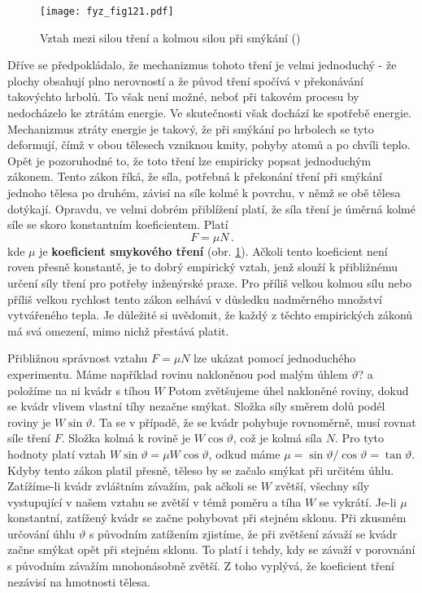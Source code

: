{    \begin{figure}[ht!]  %
      \centering
      \texttt{[image: fyz\_fig121.pdf]}
      \caption{Vztah mezi silou tření a kolmou silou při smýkání
              (\cite[s.~173]{Feynman01})}
      \label{fyz:fig121}
    \end{figure}
    Dříve se předpokládalo, že mechanizmus tohoto tření je velmi jednoduchý - že plochy obsahují 
    plno nerovností a že původ tření spočívá v překonávání takovýchto hrbolů. To však není možné, 
    neboť při takovém procesu by nedocházelo ke ztrátám energie. Ve skutečnosti však dochází ke 
    spotřebě energie. Mechanizmus ztráty energie je takový, že při smýkání po hrbolech se tyto 
    deformují, čímž v obou tělesech vzniknou kmity, pohyby atomů a po chvíli teplo. Opět je 
    pozoruhodné to, že toto tření lze empiricky popsat jednoduchým zákonem. Tento zákon říká, že 
    síla, potřebná k překonání tření při smýkání jednoho tělesa po druhém, závisí na síle kolmé k 
    povrchu, v němž se obě tělesa dotýkají. Opravdu, ve velmi dobrém přiblížení platí, že síla 
    tření je úměrná kolmé síle se skoro konstantním koeficientem. Platí
    \begin{equation}\label{FYZ:eq169}
      \boxed{F = \mu N}\,.
    \end{equation}
    kde \(\mu\) je \textbf{koeficient smykového tření} (obr. \ref{fyz:fig121}). Ačkoli tento 
    koeficient není roven přesně konstantě, je to dobrý empirický vztah, jenž slouží k přibližnému 
    určení síly tření pro potřeby inženýrské praxe. Pro příliš velkou kolmou sílu nebo příliš 
    velkou rychlost tento zákon selhává v důsledku nadměrného množství vytvářeného tepla. Je 
    důležité si uvědomit, že každý z těchto empirických zákonů má svá omezení, mimo nichž přestává 
    platit.
    
    Přibližnou správnost vztahu \(F = \mu N\) lze ukázat pomocí jednoduchého experimentu. Máme 
    například rovinu nakloněnou pod malým úhlem \(\vartheta\)? a položíme na ni kvádr s tíhou \(W\) 
    Potom zvětšujeme úhel nakloněné roviny, dokud se kvádr vlivem vlastní tíhy nezačne smýkat. 
    Složka síly směrem dolů podél roviny je \(W\sin\vartheta\). Ta se v případě, že se kvádr 
    pohybuje rovnoměrně, musí rovnat síle tření \(F\). Složka kolmá k rovině je \(W\cos\vartheta\), 
    což je kolmá síla \(N\). Pro tyto hodnoty platí vztah \(W\sin\vartheta = \mu W\cos\vartheta\), 
    odkud máme \(\mu = \sin\vartheta/\cos\vartheta = \tan\vartheta\). Kdyby tento zákon platil 
    přesně, těleso by se začalo smýkat při určitém úhlu. Zatížíme-li kvádr zvláštním závažím, pak 
    ačkoli se \(W\) zvětší, všechny síly vystupující v našem vztahu se zvětší v témž poměru a tíha 
    \(W\) se vykrátí. Je-li \(\mu\) konstantní, zatížený kvádr se začne pohybovat při stejném 
    sklonu. Při zkusmém určování úhlu \(\vartheta\) s původním zatížením zjistíme, že při zvětšení 
    závaží se kvádr začne smýkat opět při stejném sklonu. To platí i tehdy, kdy se závaží v 
    porovnání s původním závažím mnohonásobně zvětší. Z toho vyplývá, že koeficient tření nezávisí 
    na hmotnosti tělesa.
    
}
